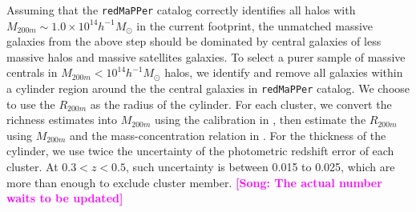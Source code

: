 \documentclass{emulateapj}
\def\redm{\texttt{redMaPPer}}
\newcommand{\song}[1]{\textcolor{magenta}{\textbf{[Song: #1]}}}
\newcommand{\alexie}[1]{\textcolor{blue}{\textbf{[Alexie: #1]}}}
\newcommand{\update}[1]{\textcolor{Bittersweet}{#1}}
\begin{document}
\begin{CJK*}{UTF8}{gbsn}
    Assuming that the \redm{} catalog correctly identifies all halos with 
    $M_{200m}\sim 1.0\times 10^{14} h^{-1} M_{\odot}$ in the current footprint,
    the unmatched massive galaxies from the above step should be dominated by central 
    galaxies of less massive halos and massive satellites galaxies.  
    \update{
    To select a purer sample of massive centrals in $M_{200m}<10^{14} h^{-1} M_{\odot}$
    halos, we identify and remove all galaxies within a cylinder region around the 
    the central galaxies in \redm{} catalog.
    We choose to use the $R_{200m}$ as the radius of the cylinder. 
    For each cluster, we convert the richness estimates into $M_{200m}$ using the 
    calibration in \citep{Simet2016}, then estimate the $R_{200m}$ using $M_{200m}$
    and the mass-concentration relation in \citep{Diemer2015}. 
    For the thickness of the cylinder, we use twice the uncertainty of the photometric 
    redshift error of each cluster.  
    At $0.3 < z < 0.5$, such uncertainty is between 0.015 to 0.025, which are more than 
    enough to exclude cluster member.}
    \song{The actual number waits to be updated}
    
    

\end{CJK*}
\end{document}
